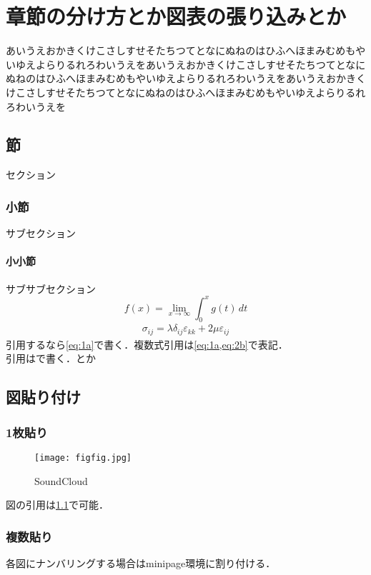 \documentclass[main.tex]{subfiles}
\begin{document}
\setcounter{chapter}{0}     %


\chapter{章節の分け方とか図表の張り込みとか}
\thispagestyle{fancy}
あいうえおかきくけこさしすせそたちつてとなにぬねのはひふへほまみむめもやいゆえよらりるれろわいうえをあいうえおかきくけこさしすせそたちつてとなにぬねのはひふへほまみむめもやいゆえよらりるれろわいうえをあいうえおかきくけこさしすせそたちつてとなにぬねのはひふへほまみむめもやいゆえよらりるれろわいうえを


\section{節}
セクション


\subsection{小節}
サブセクション


\subsubsection{小小節}
サブサブセクション
\begin{equation}
    f(x) = \lim_{x\to\infty} \int_0^x g(t)\,dt
    \label{eq:1a}
\end{equation}
\begin{align}
    \sigma_{ij}=\lambda\delta_{ij}\varepsilon_{kk}+2\mu\varepsilon_{ij}
    \label{eq:2b}
\end{align}
引用するなら\cref{eq:1a}で書く．複数式引用は\cref{eq:1a,eq:2b}で表記．\\
引用は\cite{Nagai2020}で書く．\cite{akiyama2015m}とか

\clearpage
\section{図貼り付け}
\subsection{1枚貼り}
\begin{figure}[h]
    \centering
    \texttt{[image: figfig.jpg]}
    \caption{SoundCloud}
    \label{fig1}
\end{figure}
図の引用は\cref{fig1}で可能．


\subsection{複数貼り}
各図にナンバリングする場合はminipage環境に割り付ける．
\end{document}
